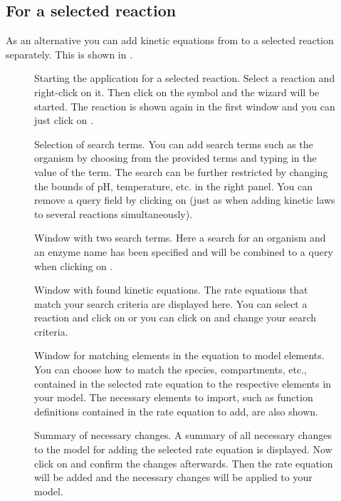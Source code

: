 \subsection{For a selected reaction}
As an alternative you can add kinetic equations from \SABIO to a selected reaction separately. This is shown in .
 
\begin{figure}[htbp]
\caption{Starting the \SABIO application for a selected reaction.
Select a reaction and right-click on it.
Then click on the \SABIO symbol and the wizard will be started.
The reaction is shown again in the first window and you can just click on .}
\label{fig:startManual}
\end{figure}
\begin{figure}[htbp]
\caption{Selection of search terms.
You can add search terms such as the organism by choosing from the provided terms and
typing in the value of the term. The search can be further restricted by changing the
bounds of pH, temperature, etc. in the right panel. 
You can remove a query field by clicking on 
(just as when adding kinetic laws to several reactions simultaneously).}
\label{fig:searchTermsManual}
\end{figure}
\begin{figure}[htbp]
\caption{Window with two search terms.
Here a search for an organism and an enzyme name has been specified and will be
combined to a query when clicking on .}
\label{fig:searchTermsQuery}
\end{figure}
\begin{figure}[htbp]
\caption{Window with found kinetic equations.
The rate equations that match your search criteria are displayed here.
You can select a reaction and click on  or you can click on 
and change your search criteria.}
\label{fig:foundEquationsManual}
\end{figure}
\begin{figure}[htbp]
\caption{Window for matching elements in the equation to model elements.
You can choose how to match the species, compartments, etc., contained in the selected rate 
equation to the respective \SBML elements in your model. The necessary elements to import,
such as function definitions contained in the rate equation to add, are also shown.}
\label{fig:matching}
\end{figure}
\begin{figure}[htbp]
\caption{Summary of necessary changes.
A summary of all necessary changes to the model for adding the selected rate equation is displayed.
Now click on  and confirm the changes afterwards. Then the rate equation will be
added and the necessary changes will be applied to your model.}
\label{fig:changesManual}
\end{figure}

